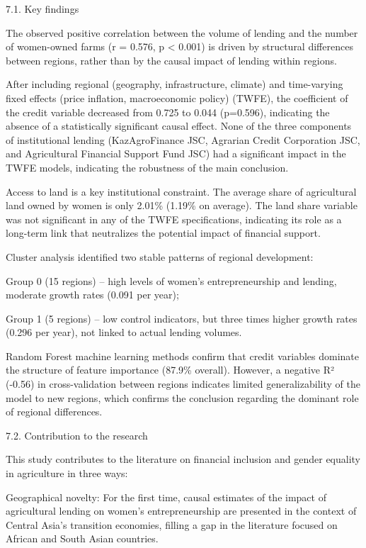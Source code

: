 \documentclass[
]{article}
\begin{document}
7.1. Key findings

The observed positive correlation between the volume of lending and the
number of women-owned farms (r = 0.576, p \textless{} 0.001) is driven
by structural differences between regions, rather than by the causal
impact of lending within regions.

After including regional (geography, infrastructure, climate) and
time-varying fixed effects (price inflation, macroeconomic policy)
(TWFE), the coefficient of the credit variable decreased from 0.725 to
0.044 (p=0.596), indicating the absence of a statistically significant
causal effect. None of the three components of institutional lending
(KazAgroFinance JSC, Agrarian Credit Corporation JSC, and Agricultural
Financial Support Fund JSC) had a significant impact in the TWFE models,
indicating the robustness of the main conclusion.

Access to land is a key institutional constraint. The average share of
agricultural land owned by women is only 2.01\% (1.19\% on average). The
land share variable was not significant in any of the TWFE
specifications, indicating its role as a long-term link that neutralizes
the potential impact of financial support.

Cluster analysis identified two stable patterns of regional development:

Group 0 (15 regions) -- high levels of women's entrepreneurship and
lending, moderate growth rates (0.091 per year);

Group 1 (5 regions) -- low control indicators, but three times higher
growth rates (0.296 per year), not linked to actual lending volumes.

Random Forest machine learning methods confirm that credit variables
dominate the structure of feature importance (87.9\% overall). However,
a negative R² (-0.56) in cross-validation between regions indicates
limited generalizability of the model to new regions, which confirms the
conclusion regarding the dominant role of regional differences.

7.2. Contribution to the research

This study contributes to the literature on financial inclusion and
gender equality in agriculture in three ways:

Geographical novelty: For the first time, causal estimates of the impact
of agricultural lending on women's entrepreneurship are presented in the
context of Central Asia's transition economies, filling a gap in the
literature focused on African and South Asian countries.
\end{document}
